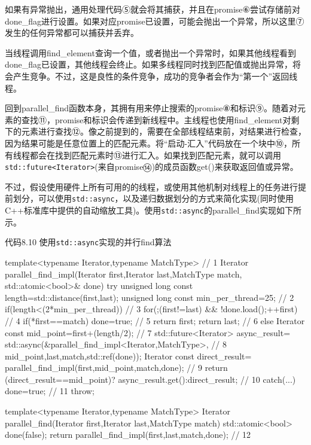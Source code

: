 如果有异常抛出，通用处理代码⑤就会将其捕获，并且在promise⑥尝试存储前对done\_flag进行设置。如果对应promise已设置，可能会抛出一个异常，所以这里⑦发生的任何异常都可以捕获并丢弃。

当线程调用find\_element查询一个值，或者抛出一个异常时，如果其他线程看到done\_flag已设置，其他线程会终止。如果多线程同时找到匹配值或抛出异常，将会产生竞争。不过，这是良性的条件竞争，成功的竞争者会作为“第一个”返回线程。

回到parallel\_find函数本身，其拥有用来停止搜索的promise⑧和标识⑨。随着对元素的查找⑪，promise和标识会传递到新线程中。主线程也使用find\_element对剩下的元素进行查找⑫。像之前提到的，需要在全部线程结束前，对结果进行检查，因为结果可能是任意位置上的匹配元素。将“启动-汇入”代码放在一个块中⑩，所有线程都会在找到匹配元素时⑬进行汇入。如果找到匹配元素，就可以调用\texttt{std::future<Iterator>}(来自promise⑭)的成员函数get()来获取返回值或异常。

不过，假设使用硬件上所有可用的的线程，或使用其他机制对线程上的任务进行提前划分，可以使用\texttt{std::async}，以及递归数据划分的方式来简化实现(同时使用C++标准库中提供的自动缩放工具)。使用\texttt{std::async}的parallel\_find实现如下所示。

代码8.10 使用\texttt{std::async}实现的并行find算法

\begin{cpp}
template<typename Iterator,typename MatchType>  // 1
Iterator parallel_find_impl(Iterator first,Iterator last,MatchType match,
                            std::atomic<bool>& done)
{
  try
  {
    unsigned long const length=std::distance(first,last);
    unsigned long const min_per_thread=25;  // 2
    if(length<(2*min_per_thread))  // 3
    {
      for(;(first!=last) && !done.load();++first)  // 4
      {
        if(*first==match)
        {
          done=true;  // 5
          return first;
        }
      }
      return last;  // 6
    }
    else
    {
      Iterator const mid_point=first+(length/2);  // 7
      std::future<Iterator> async_result=
        std::async(&parallel_find_impl<Iterator,MatchType>,  // 8
                   mid_point,last,match,std::ref(done));
      Iterator const direct_result=
        parallel_find_impl(first,mid_point,match,done);  // 9
      return (direct_result==mid_point)?
        async_result.get():direct_result;  // 10
    }
  }
  catch(...)
  {
    done=true;  // 11
    throw;
  }
}

template<typename Iterator,typename MatchType>
Iterator parallel_find(Iterator first,Iterator last,MatchType match)
{
  std::atomic<bool> done(false);
  return parallel_find_impl(first,last,match,done);  // 12
}
\end{cpp}

